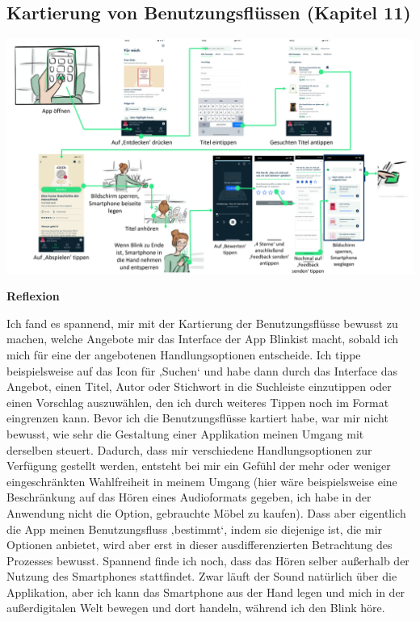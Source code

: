 \documentclass[
  a4paper,
]{book}
\begin{document}
\subsection*{Kartierung von Benutzungsflüssen (Kapitel 11)}\label{kartierung-von-benutzungsfluxfcssen-kapitel-11}

\begin{center}\includegraphics{Figures/11-Bsp.1} \end{center}

\textbf{Reflexion}

Ich fand es spannend, mir mit der Kartierung der Benutzungsflüsse bewusst zu machen, welche Angebote mir das Interface der App Blinkist macht, sobald ich mich für eine der angebotenen Handlungsoptionen entscheide. Ich tippe beispielsweise auf das Icon für ‚Suchen` und habe dann durch das Interface das Angebot, einen Titel, Autor oder Stichwort in die Suchleiste einzutippen oder einen Vorschlag auszuwählen, den ich durch weiteres Tippen noch im Format eingrenzen kann. Bevor ich die Benutzungsflüsse kartiert habe, war mir nicht bewusst, wie sehr die Gestaltung einer Applikation meinen Umgang mit derselben steuert. Dadurch, dass mir verschiedene Handlungsoptionen zur Verfügung gestellt werden, entsteht bei mir ein Gefühl der mehr oder weniger eingeschränkten Wahlfreiheit in meinem Umgang (hier wäre beispielsweise eine Beschränkung auf das Hören eines Audioformats gegeben, ich habe in der Anwendung nicht die Option, gebrauchte Möbel zu kaufen). Dass aber eigentlich die App meinen Benutzungsfluss ‚bestimmt`, indem sie diejenige ist, die mir Optionen anbietet, wird aber erst in dieser ausdifferenzierten Betrachtung des Prozesses bewusst. Spannend finde ich noch, dass das Hören selber außerhalb der Nutzung des Smartphones stattfindet. Zwar läuft der Sound natürlich über die Applikation, aber ich kann das Smartphone aus der Hand legen und mich in der außerdigitalen Welt bewegen und dort handeln, während ich den Blink höre.
\end{document}
